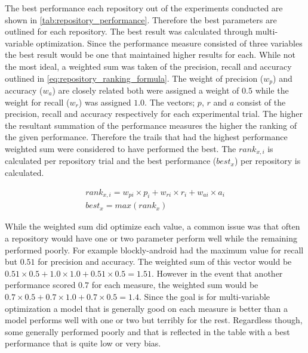 The best performance each repository out of the experiments conducted are shown in \autoref{tab:repository_performance}. Therefore the best parameters are outlined for each repository. The best result was calculated through multi-variable optimization. Since the performance measure consisted of three variables the best result would be one that maintained higher results for each. While not the most ideal, a weighted sum was taken of the precision, recall and accuracy outlined in \autoref{eq:repository_ranking_formula}. The weight of precision ($w_{p}$) and accuracy ($w_{a}$) are closely related both were assigned a weight of $0.5$ while the weight for recall ($w_{r}$) was assigned $1.0$. The vectors; $p$, $r$ and $a$ consist of the precision, recall and accuracy respectively for each experimental trial. The higher the resultant summation of the performance measures the higher the ranking of the given performance. Therefore the trails that had the highest performance weighted sum were considered to have performed the best. The $rank_{x,i}$ is calculated per repository trial and the best performance ($best_{x}$) per repository is calculated.

\begin{equation} 
\label{eq:repository_ranking_formula}
\begin{matrix}
rank_{x,i} = w_{pi} \times p_i + w_{ri} \times r_i + w_{ai} \times a_i \\
best_{x} = max(rank_{x})
\end{matrix}
\end{equation}

While the weighted sum did optimize each value, a common issue was that often a repository would have one or two parameter perform well while the remaining performed poorly. For example blockly-android had the maximum value for recall but $0.51$ for precision and accuracy. The weighted sum of this vector would be $0.51 \times 0.5 + 1.0 \times 1.0 + 0.51 \times 0.5 = 1.51$. However in the event that another performance scored $0.7$ for each measure, the weighted sum would be $0.7 \times 0.5 + 0.7 \times 1.0 + 0.7 \times 0.5 = 1.4$. Since the goal is for multi-variable optimization a model that is generally good on each measure is better than a model performs well with one or two but terribly for the rest. Regardless though, some generally performed poorly and that is reflected in the table with a best performance that is quite low or very bias. 

